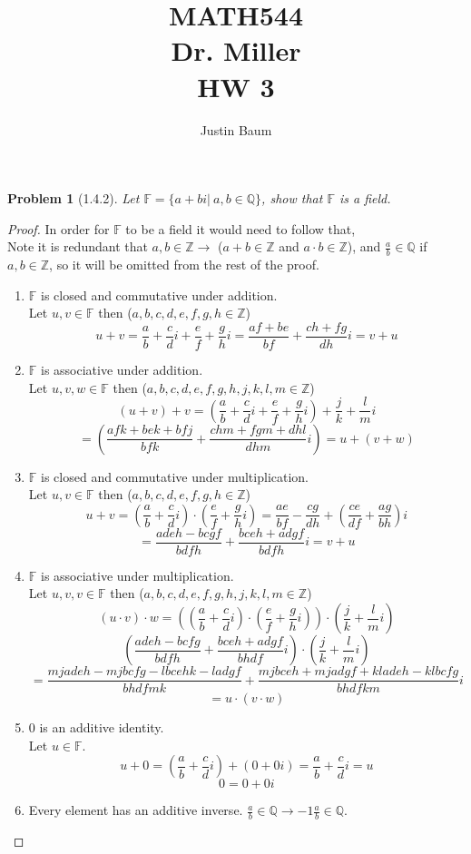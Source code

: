 \documentclass[12pt]{article}   %
\title{MATH544 \\ Dr. Miller \\ HW 3}
\author{Justin Baum}
\newcommand{\Z}{\mathbb{Z}} %
\newcommand{\Q}{\mathbb{Q}} %
\newcommand{\F}{\mathbb{F}} %
\newtheorem{problem}{Problem}
\begin{document}
\maketitle

\begin{problem}[1.4.2]
Let $\F = \{a+bi|\ a,b\in\Q\}$, show that $\F$ is a field.
\end{problem}
\begin{proof}
In order for $\F$ to be a field it would need to follow that,\\
Note it is redundant that $a,b\in\Z \rightarrow$ ($a+b\in\Z$ and $a\cdot b\in\Z$), and $\frac{a}{b}\in\Q$ if $a,b\in\Z$, so it will be omitted from the rest of the proof.
\begin{enumerate}
    \item $\F$ is closed and commutative under addition.\\
    Let $u, v \in \F$ then ($a,b,c,d,e,f,g,h\in\Z$)
    \[u+v=\frac{a}{b}+\frac{c}{d}i+\frac{e}{f}+\frac{g}{h}i=\frac{af+be}{bf}+\frac{ch+fg}{dh}i=v+u\]
    \item $\F$ is associative under addition.\\
    Let $u, v,w \in \F$ then ($a,b,c,d,e,f,g,h,j,k,l,m\in\Z$)
    \[(u+v)+v=(\frac{a}{b}+\frac{c}{d}i+\frac{e}{f}+\frac{g}{h}i)+\frac{j}{k}+\frac{l}{m}i\]
    \[=(\frac{afk+bek+bfj}{bfk}+\frac{chm+fgm+dhl}{dhm}i)=u+(v+w)\]
    \item $\F$ is closed and commutative under multiplication.\\
    Let $u, v \in \F$ then ($a,b,c,d,e,f,g,h\in\Z$)
    \[u+v=(\frac{a}{b}+\frac{c}{d}i)\cdot(\frac{e}{f}+\frac{g}{h}i)=\frac{ae}{bf}-\frac{cg}{dh}+(\frac{ce}{df}+\frac{ag}{bh})i\]
    \[=\frac{adeh-bcgf}{bdfh}+\frac{bceh+adgf}{bdfh}i=v+u\]
    \item $\F$ is associative under multiplication.\\
    Let $u, v,v \in \F$ then ($a,b,c,d,e,f,g,h,j,k,l,m\in\Z$)
    \[(u\cdot v)\cdot w=((\frac{a}{b}+\frac{c}{d}i)\cdot(\frac{e}{f}+\frac{g}{h}i))\cdot(\frac{j}{k}+\frac{l}{m}i)\]
    \[(\frac{adeh-bcfg}{bdfh}+\frac{bceh+adgf}{bhdf}i)\cdot(\frac{j}{k}+\frac{l}{m}i)\]
    \[=\frac{mjadeh-mjbcfg-lbcehk-ladgf}{bhdfmk}+\frac{mjbceh+mjadgf+kladeh-klbcfg}{bhdfkm}i\]\[=u\cdot(v\cdot w)\]
    \item $ 0$ is an additive identity.\\
    Let $u\in \F$.
    \[u+ 0=(\frac{a}{b}+\frac{c}{d}i)+(0+0i)=\frac{a}{b}+\frac{c}{d}i=u\]
    \[ 0=0+0i\]
    \item Every element has an additive inverse. $\frac{a}{b}\in\Q\rightarrow -1\frac{a}{b}\in\Q$.\\

\end{enumerate}
\end{proof}
\end{document}

